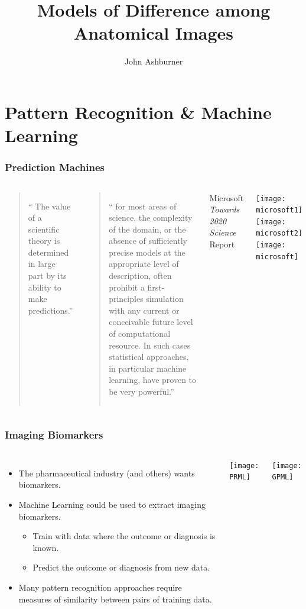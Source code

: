 \documentclass{beamer}
\title[Anatomical Variability]{Models of Difference among Anatomical Images}
\author{John Ashburner}
\institute[john@fil.ion.ucl.ac.uk]{Wellcome Trust Centre for Neuroimaging\\
UCL Institute of Neurlogy\\
London, UK.}
\date{}
\begin{document}

\begin{frame}
\titlepage
\end{frame}

\section{Pattern Recognition \& Machine Learning}

\begin{frame}
\frametitle{Prediction Machines}
\begin{columns}[c]
\begin{quote}``
The value of a scientific theory is determined in large part by its ability to make
predictions.''
\end{quote}

\begin{quote}``
for most areas of science, the complexity of the domain, or the
absence of sufficiently precise models at the appropriate level of description,
often prohibit a first-principles simulation with any current or conceivable
future level of computational resource. In such cases statistical approaches, in
particular machine learning, have proven to be very powerful.''
\end{quote}
\begin{center}Microsoft \emph{Towards 2020 Science} Report\end{center}
\texttt{[image: microsoft1]}\\
\texttt{[image: microsoft2]}\\
\texttt{[image: microsoft]}
\end{columns}
\end{frame}

\begin{frame}
\frametitle{Imaging Biomarkers}
\begin{columns}[c]
\begin{itemize}
\item{The pharmaceutical industry (and others) wants biomarkers.}
\item{Machine Learning could be used to extract imaging biomarkers.}
\begin{itemize}
\item{Train with data where the outcome or diagnosis is known.}
\item{Predict the outcome or diagnosis from new data.}
\end{itemize}
\item{Many pattern recognition approaches require measures of similarity between pairs of training data.}
\end{itemize}
\texttt{[image: PRML]}

\texttt{[image: GPML]}
\end{columns}
\end{frame}
\end{document}
